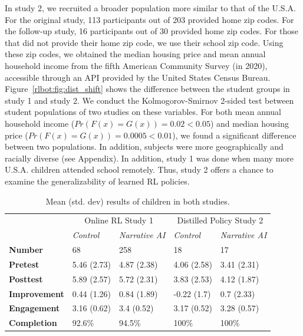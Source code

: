 \documentclass[sn-mathphys,Numbered]{sn-jnl}%
\theoremstyle{thmstyleone}%
\theoremstyle{thmstyletwo}%
\theoremstyle{thmstylethree}%
\begin{document}
In study 2, we recruited a broader population more similar to that of the U.S.A.  For the original study, 113 participants out of 203 provided home zip codes. For the follow-up study, 16 participants out of 30 provided home zip codes.  For those that did not provide their home zip code, we use their school zip code. Using these zip codes, we  obtained the median housing price and mean annual household income from the fifth American Community Survey (in 2020), accessible through an API provided by the United States Census Bureau.  Figure~\ref{rlbot:fig:dist_shift} shows the difference between the student groups in study 1 and study 2. 
We conduct the Kolmogorov-Smirnov 2-sided test between student populations of two studies on these variables. For both mean annual household income ($Pr(F(x)=G(x)) = 0.02 < 0.05$) and median housing price ($Pr(F(x)=G(x)) = 0.0005 < 0.01$), we found a significant difference between two populations.
In addition, subjects were more geographically and racially diverse (see Appendix). %
In addition, study 1 was done when many more U.S.A. children attended school remotely. Thus, study 2 offers a chance to examine the generalizability of learned RL policies. 







\begin{table}[b]
\centering %
\caption{Mean (std. dev) results of children in both studies.} 
\begin{tabular}{@{}lll|ll@{}}
\toprule
& \multicolumn{2}{c}{Online RL Study 1} & \multicolumn{2}{|c}{Distilled Policy  Study 2} \\
& \textit{Control} & \textit{Narrative AI} & \textit{Control} & \textit{Narrative AI}\\
\midrule
\textbf{Number} &68  & 258  & 18 & 17 \\
\textbf{Pretest} & 5.46 (2.73) & 4.87 (2.38) & 4.06 (2.58) & 3.41 (2.31) \\
\textbf{Posttest} & 5.89 (2.57) & 5.72 (2.31) & 3.83 (2.53) & 4.12 (1.87) \\
\textbf{Improvement} & 0.44 (1.26) & 0.84 (1.89) & -0.22 (1.7) & 0.7 (2.33)\\
\midrule
\textbf{Engagement} & 3.16 (0.62) & 3.4 (0.52) & 3.17 (0.52) & 3.28 (0.57) \\
\textbf{Completion} & 92.6\% & 94.5\% & 100\% & 100\% \\
\bottomrule
\end{tabular}
\label{rlbot:tab:offline_results}
\end{table}
\end{document}
